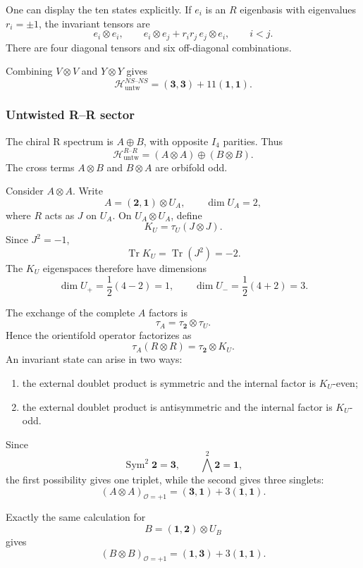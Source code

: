 \documentclass[
  10pt,
  a4paper,
  openany]{book}
\providecommand{\tightlist}{%
  \setlength{\itemsep}{0pt}\setlength{\parskip}{0pt}}
\begin{document}
One can display the ten states explicitly. If \(e_i\) is an \(R\)
eigenbasis with eigenvalues \(r_i=\pm1\), the invariant tensors are \[
e_i\otimes e_i,
\qquad
e_i\otimes e_j
+
r_ir_j\,e_j\otimes e_i,
\qquad
i<j.
\] There are four diagonal tensors and six off-diagonal combinations.

Combining \(V\otimes V\) and \(Y\otimes Y\) gives \[
\boxed{
\mathcal H_{\mathrm{untw}}^{NS\text{--}NS}
=
(\mathbf3,\mathbf3)
+
11(\mathbf1,\mathbf1)
}.
\]

\subsubsection{Untwisted R--R sector}\label{untwisted-rr-sector}

The chiral R spectrum is \(A\oplus B\), with opposite \(I_4\) parities.
Thus \[
\boxed{
\mathcal H_{\mathrm{untw}}^{R\text{--}R}
=
(A\otimes A)
\oplus
(B\otimes B)
}.
\] The cross terms \(A\otimes B\) and \(B\otimes A\) are orbifold odd.

Consider \(A\otimes A\). Write \[
A
=
(\mathbf2,\mathbf1)\otimes U_A,
\qquad
\dim U_A=2,
\] where \(R\) acts as \(J\) on \(U_A\). On \(U_A\otimes U_A\), define
\[
K_U
=
\tau_U(J\otimes J).
\] Since \(J^2=-1\), \[
\operatorname{Tr}K_U
=
\operatorname{Tr}(J^2)
=-2.
\] The \(K_U\) eigenspaces therefore have dimensions \[
\dim U_{+}
=
\frac12(4-2)
=1,
\qquad
\dim U_{-}
=
\frac12(4+2)
=3.
\]

The exchange of the complete \(A\) factors is \[
\tau_A
=
\tau_{\mathbf2}\otimes\tau_U.
\] Hence the orientifold operator factorizes as \[
\tau_A(R\otimes R)
=
\tau_{\mathbf2}\otimes K_U.
\] An invariant state can arise in two ways:

\begin{enumerate}
\def\labelenumi{\arabic{enumi}.}
\tightlist
\item
  the external doublet product is symmetric and the internal factor is
  \(K_U\)-even;
\item
  the external doublet product is antisymmetric and the internal factor
  is \(K_U\)-odd.
\end{enumerate}

Since \[
\operatorname{Sym}^2\mathbf2=\mathbf3,
\qquad
\bigwedge^2\mathbf2=\mathbf1,
\] the first possibility gives one triplet, while the second gives three
singlets: \[
\boxed{
(A\otimes A)_{\mathcal O=+1}
=
(\mathbf3,\mathbf1)
+
3(\mathbf1,\mathbf1)
}.
\]

Exactly the same calculation for \[
B
=
(\mathbf1,\mathbf2)\otimes U_B
\] gives \[
\boxed{
(B\otimes B)_{\mathcal O=+1}
=
(\mathbf1,\mathbf3)
+
3(\mathbf1,\mathbf1)
}.
\]
\end{document}
